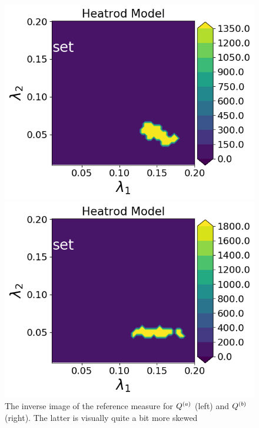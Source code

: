 \begin{figure}[h]
\begin{minipage}{.475\textwidth}
\includegraphics[width=\linewidth]{examples/fig_heatrod_q1/tHeatrodModel--set_N500_em.png}
\end{minipage}
\begin{minipage}{.475\textwidth}
\includegraphics[width=\linewidth]{examples/fig_heatrod_q2/tHeatrodModel--set_N500_em.png}
\end{minipage}
\caption{The inverse image of the reference measure for $Q^{(a)}$ (left) and $Q^{(b)}$ (right). The latter is visually quite a bit more skewed }
\label{fig:NLbotleft}
\end{figure}

